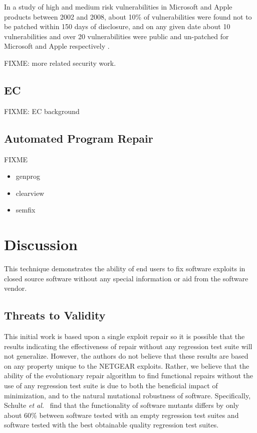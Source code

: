 \documentclass{sigcomm-alternate}
\begin{document}
{In a study of high and medium risk vulnerabilities in Microsoft and
Apple products between 2002 and 2008, about 10\% of
vulnerabilities were found not to be patched within 150 days of
disclosure, and on any given date about 10 vulnerabilities and over 20
vulnerabilities were public and un-patched for Microsoft and Apple
respectively \cite{frei20080}.

FIXME: more related security work.

\subsection{EC}
\label{sec-5-2}

FIXME: EC background

\subsection{Automated Program Repair}
\label{sec-5-3}

FIXME

\begin{itemize}
\item genprog
\item clearview
\item semfix
\end{itemize}

\section{Discussion}
\label{sec-6}
This technique demonstrates the ability of end users to fix software
exploits in closed source software without any special information or
aid from the software vendor.

\subsection{Threats to Validity}
\label{sec-6-1}
This initial work is based upon a single exploit repair so it is
possible that the results indicating the effectiveness of repair
without any regression test suite will not generalize.  However, the
authors do not believe that these results are based on any property
unique to the NETGEAR exploits. Rather, we believe that the ability of
the evolutionary repair algorithm to find functional repairs without
the use of any regression test suite is due to both the beneficial
impact of minimization, and to the natural mutational robustness of
software. Specifically, Schulte \emph{et al.}~\cite{schulte2013software} 
find that the functionality of software mutants differs by only about 60\%
between software tested with an empty regression test suites and software
tested with the best obtainable quality regression test suites.

}
\end{document}
